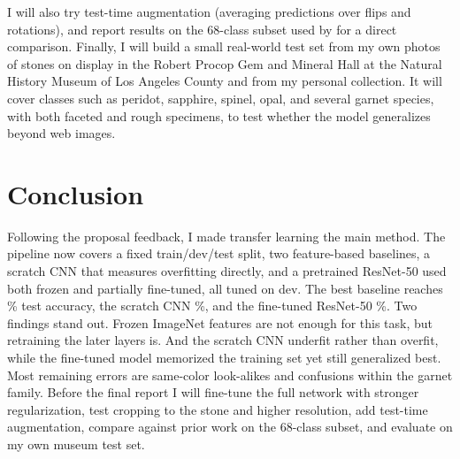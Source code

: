 \documentclass{article}
\newcommand{\fillin}[1]{\textcolor{red}{[#1]}}
\newcommand{\pending}{\fillin{run notebook}}
\newcommand{\resultinput}[1]{\IfFileExists{\ResultsDir/#1}{}{\fbox{\pending}}}
\begin{document}
I will also try test-time augmentation (averaging predictions over flips and rotations), and report results on the 68-class subset used by \citet{chow2022gemstone} for a direct comparison. Finally, I will build a small real-world test set from my own photos of stones on display in the Robert Procop Gem and Mineral Hall at the Natural History Museum of Los Angeles County and from my personal collection. It will cover classes such as peridot, sapphire, spinel, opal, and several garnet species, with both faceted and rough specimens, to test whether the model generalizes beyond web images.

\begin{table}[t]
\caption{Class pairs most often confused on dev by \ErrModel{}, counting errors in both directions.}
\label{tab:confused}
\vskip 0.1in
\begin{center}
\begin{small}
\resultinput{table_confused.tex}
\end{small}
\end{center}
\vskip -0.1in
\end{table}

\section{Conclusion}

Following the proposal feedback, I made transfer learning the main method. The pipeline now covers a fixed train/dev/test split, two feature-based baselines, a scratch CNN that measures overfitting directly, and a pretrained ResNet-50 used both frozen and partially fine-tuned, all tuned on dev. The best baseline reaches \RFTest\% test accuracy, the scratch CNN \CNNTest\%, and the fine-tuned ResNet-50 \FTTest\%. Two findings stand out. Frozen ImageNet features are not enough for this task, but retraining the later layers is. And the scratch CNN underfit rather than overfit, while the fine-tuned model memorized the training set yet still generalized best. Most remaining errors are same-color look-alikes and confusions within the garnet family. Before the final report I will fine-tune the full network with stronger regularization, test cropping to the stone and higher resolution, add test-time augmentation, compare against prior work on the 68-class subset, and evaluate on my own museum test set.



\end{document}
